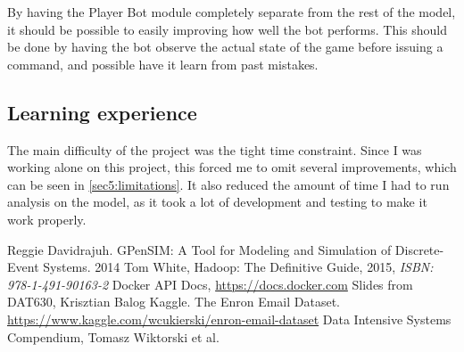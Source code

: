 \documentclass[runningheads,a4paper]{llncs}
\begin{document}
By having the Player Bot module completely separate from the rest of the model, it should be possible to easily improving how well the bot performs. This should be done by having the bot observe the actual state of the game before issuing a command, and possible have it learn from past mistakes.

\subsection{Learning experience}
\label{sec5_learning_experience}
The main difficulty of the project was the tight time constraint. Since I was working alone on this project, this forced me to omit several improvements, which can be seen in \ref{sec5:limitations}. It also reduced the amount of time I had to run analysis on the model, as it took a lot of development and testing to make it work properly.
\clearpage
\begin{thebibliography}{6}

 Reggie Davidrajuh. GPenSIM: A Tool for Modeling and Simulation of Discrete-Event Systems. 2014
 Tom White, Hadoop: The Definitive Guide, 2015, \emph{ISBN: 978-1-491-90163-2}
 Docker API Docs, \url{https://docs.docker.com}
 Slides from DAT630, Krisztian Balog
 Kaggle. The Enron Email Dataset. \url{https://www.kaggle.com/wcukierski/enron-email-dataset}
 Data Intensive Systems Compendium, Tomasz Wiktorski et al.

\end{thebibliography}
\appendix
\end{document}
